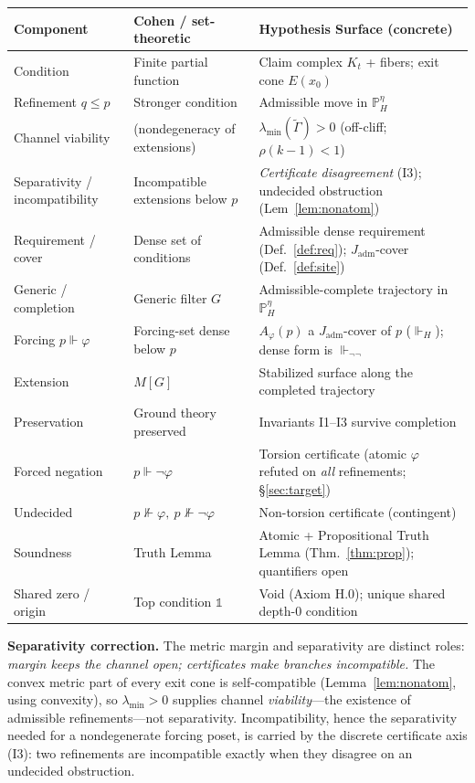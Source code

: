 \documentclass[11pt]{article}
\theoremstyle{definition}
\theoremstyle{remark}
\newcommand{\forcesH}{\Vdash_{H}}
\newcommand{\forcesnn}{\Vdash_{\neg\neg}}
\newcommand{\PHeta}{\mathbb{P}_{H}^{\eta}}
\newcommand{\refines}{\leq}
\newcommand{\Gam}{\tilde{\Gamma}}
\newcommand{\lmin}{\lambda_{\min}}
\newcommand{\Kt}{K_{t}}
\newcommand{\Jadm}{J_{\mathrm{adm}}}
\begin{document}
\begin{center}
\renewcommand{\arraystretch}{1.25}
\begin{tabular}{@{}p{} p{} p{}@{}}
\toprule
\textbf{Component} & \textbf{Cohen / set-theoretic} & \textbf{Hypothesis Surface (concrete)} \\
\midrule
Condition & Finite partial function & Claim complex $\Kt$ + fibers; exit cone $E(x_0)$ \\
Refinement $q\refines p$ & Stronger condition & Admissible move in $\PHeta$ \\
Channel viability & (nondegeneracy of extensions) & $\lmin(\Gam)>0$ (off-cliff; $\rho(k-1)<1$) \\
Separativity / incompatibility & Incompatible extensions below $p$ & \emph{Certificate disagreement} (I3); undecided obstruction (Lem~\ref{lem:nonatom}) \\
Requirement / cover & Dense set of conditions & Admissible dense requirement (Def.~\ref{def:req}); $\Jadm$-cover (Def.~\ref{def:site}) \\
Generic / completion & Generic filter $G$ & Admissible-complete trajectory in $\PHeta$ \\
Forcing $p\Vdash\varphi$ & Forcing-set dense below $p$ & $A_\varphi(p)$ a $\Jadm$-cover of $p$ ($\forcesH$); dense form is $\forcesnn$ \\
Extension & $M[G]$ & Stabilized surface along the completed trajectory \\
Preservation & Ground theory preserved & Invariants I1--I3 survive completion \\
Forced negation & $p\Vdash\neg\varphi$ & Torsion certificate (atomic $\varphi$ refuted on \emph{all} refinements; \S\ref{sec:target}) \\
Undecided & $p\nVdash\varphi,\ p\nVdash\neg\varphi$ & Non-torsion certificate (contingent) \\
Soundness & Truth Lemma & Atomic + Propositional Truth Lemma (Thm.~\ref{thm:prop}); quantifiers open \\
Shared zero / origin & Top condition $\mathbb{1}$ & Void (Axiom H.0); unique shared depth-$0$ condition \\
\bottomrule
\end{tabular}
\end{center}

\noindent\textbf{Separativity correction.} The metric margin and separativity are distinct roles:
\emph{margin keeps the channel open; certificates make branches incompatible.} The convex metric part
of every exit cone is self-compatible (Lemma~\ref{lem:nonatom}, using convexity), so $\lmin>0$
supplies channel \emph{viability}---the existence of admissible refinements---not separativity.
Incompatibility, hence the separativity needed for a nondegenerate forcing poset, is carried by the
discrete certificate axis (I3): two refinements are incompatible exactly when they disagree on an
undecided obstruction.
\end{document}
